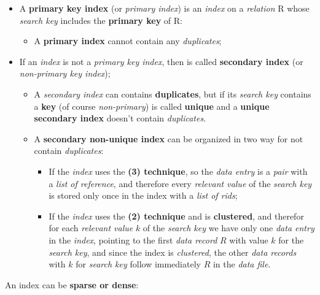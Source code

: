 \documentclass{article}
\begin{document}
\begin{itemize}
\item A \textbf{primary key index} (or \emph{primary index}) is an \emph{index} on a \emph{relation} R whose \emph{search key} includes the \textbf{primary key} of R:
\begin{itemize}
\item A \textbf{primary index} cannot contain any \emph{duplicates};
\end{itemize}
\item If an \emph{index} is not a \emph{primary key index}, then is called \textbf{secondary index }(or \emph{non-primary key index});
\begin{itemize}
\item A \emph{secondary index} can contains \textbf{duplicates}, but if its \emph{search key} contains a \textbf{key} (of course \emph{non-primary}) is called \textbf{unique} and a \textbf{unique secondary index} doesn't contain \emph{duplicates}. 
\item A \textbf{secondary non-unique index} can be organized in two way for not contain \emph{duplicates}:
\begin{itemize}
\item If the \emph{index} uses the \textbf{(3) technique}, so the \emph{data entry} is a \emph{pair} with a \emph{list of reference}, and therefore every \emph{relevant value} of the \emph{search key }is stored only once in the index with a \emph{list of rids};
\item If the \emph{index} uses the \textbf{(2) technique} and is \textbf{clustered}, and therefor for each \emph{relevant value} $k$ of the \emph{search key} we have only one \emph{data entry} in the \emph{index}, pointing to the first \emph{data record} $R$ with value $k$ for the \emph{search key}, and since the index is \emph{clustered}, the other \emph{data records} with $k$ for \emph{search key} follow immediately $R$ in the \emph{data file}.
\end{itemize}
\end{itemize}
\end{itemize}
An index can be \textbf{sparse or dense}:
\end{document}
